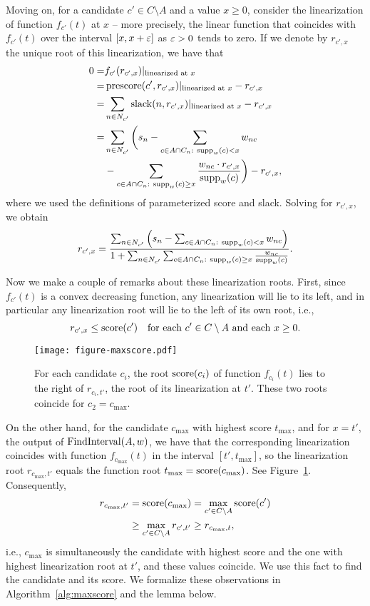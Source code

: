 Moving on, for a candidate $c'\in C\setminus A$ and a value $x\geq 0$, consider the linearization of function $f_{c'}(t)$ at $x$ -- more precisely, the linear function that coincides with $f_{c'}(t)$ over the interval $[x, x+\varepsilon]$ as $\varepsilon>0$ tends to zero. 
If we denote by $r_{c', x}$ the unique root of this linearization, we have that
\begin{align*}
    0=& f_{c'}(r_{c', x})|_{\text{linearized at } x}\\
    =& \operatorname{prescore}(c', r_{c', x})|_{\text{linearized at } x} - r_{c', x}\\
    =& \sum_{n\in N_{c'}} \operatorname{slack}(n,r_{c', x})|_{\text{linearized at } x} - r_{c', x}\\
    =& \sum_{n\in N_{c'}} \bigg( s_n - \sum_{c\in A\cap C_n: \ \operatorname{supp}_{w}(c)< x}w_{nc} \\
		&- \sum_{c\in A\cap C_n: \ \operatorname{supp}_w(c)\geq x} \frac{w_{nc}\cdot r_{c', x} }{\operatorname{supp}_w(c)} \bigg) - r_{c', x},
\end{align*} 
%
where we used the definitions of parameterized score and slack. Solving for $r_{c', x}$, we obtain
%
\begin{align}\label{eq:linearized}
    r_{c', x}=\frac{\sum_{n\in N_{c'}} \Big( s_n - \sum_{c\in A\cap C_n: \ \supp_w(c)< x} w_{nc} \Big)}%
    {1+\sum_{n\in N_{c'}} \sum_{c\in A\cap C_n: \ \supp_w(c)\geq x} \frac{w_{nc}}{\supp_w(c)}}.
\end{align}

Now we make a couple of remarks about these linearization roots. 
First, since $f_{c'}(t)$ is a convex decreasing function, any linearization will lie to its left, and in particular any linearization root will lie to the left of its own root, i.e., 
$$r_{c', x}\leq \operatorname{score}(c') \quad \text{for each } c'\in C\setminus A \text{ and each } x\geq 0.$$

\begin{figure}[h]
  \centering
	\texttt{[image: figure-maxscore.pdf]}
  \caption{For each candidate $c_i$, the root $\operatorname{score}(c_i)$ of function $f_{c_i}(t)$ lies to the right of $r_{c_i, t'}$, the root of its linearization at $t'$. These two roots coincide for $c_2=c_{\max}$. }
  \label{fig:maxscore}
\end{figure}

On the other hand, for the candidate $c_{\max}$ with highest score $t_{\max}$, and for $x=t'$, the output of $\operatorname{FindInterval}(A,w)$, we have that the corresponding linearization coincides with function $f_{c_{\max}}(t)$ in the interval $[t', t_{\max}]$, so the linearization root $r_{c_{\max}, t'}$ equals the function root $t_{\max}=\operatorname{score}(c_{\max})$. 
See Figure~\ref{fig:maxscore}. Consequently, %
%
\begin{align*}
r_{c_{\max}, t'} &= \operatorname{score}(c_{\max}) = \max_{c'\in C\setminus A} \operatorname{score}(c') \\
	&\geq \max_{c'\in C\setminus A} r_{c', t'} \geq r_{c_{\max}, t},
\end{align*}
%
i.e., $c_{\max}$ is simultaneously the candidate with highest score and the one with highest linearization root at $t'$, and these values coincide. 
We use this fact to find the candidate and its score. We formalize these observations in Algorithm~\ref{alg:maxscore} and the lemma below.

